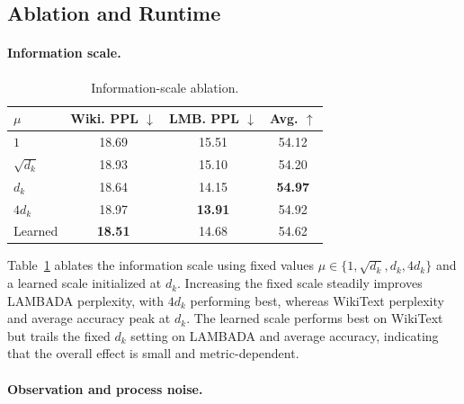 \documentclass[11pt,letterpaper,logo]{yalearxiv}
\begin{document}
\FloatBarrier

\subsection{Ablation and Runtime}
\label{sec:ablation-runtime}

\paragraph{Information scale.}
\begin{table}
  \vspace{-0.8\baselineskip}
  \centering
  \footnotesize
  \setlength{\tabcolsep}{4.5pt}
  \begin{tabular}{@{}lccc@{}}
    \toprule
    $\mu$ & Wiki. PPL $\downarrow$ & LMB. PPL $\downarrow$ & Avg. $\uparrow$ \\
    \midrule
    $1$           & 18.69 & 15.51 & 54.12 \\
    $\sqrt{d_k}$  & 18.93 & 15.10 & 54.20 \\
    $d_k$         & 18.64 & 14.15 & \textbf{54.97} \\
    $4d_k$        & 18.97 & \textbf{13.91} & 54.92 \\
    Learned       & \textbf{18.51} & 14.68 & 54.62 \\
    \bottomrule
  \end{tabular}
  \vspace{-2mm}
  \caption{Information-scale ablation.}
  \label{tab:info-scale-ablation}
  \vspace{-0.6\baselineskip}
  \vspace{-2mm}
\end{table}
Table~\ref{tab:info-scale-ablation} ablates the information scale using fixed values
$\mu\in\{1,\sqrt{d_k},d_k,4d_k\}$ and a learned scale initialized at $d_k$. Increasing the fixed scale
steadily improves LAMBADA perplexity, with $4d_k$ performing best, whereas WikiText
perplexity and average accuracy peak at $d_k$. The learned scale performs best on WikiText but
trails the fixed $d_k$ setting on LAMBADA and average accuracy, indicating that the overall effect
is small and metric-dependent.

\FloatBarrier

\paragraph{Observation and process noise.}
\end{document}

